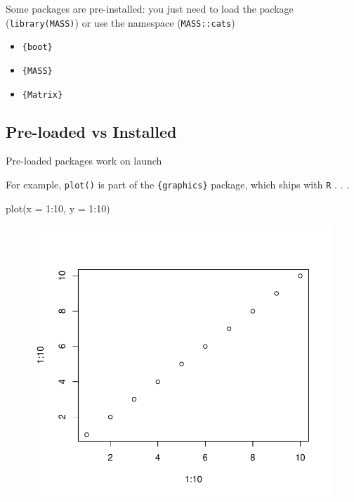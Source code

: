 \documentclass[
  letterpaper,
  DIV=11,
  numbers=noendperiod,
  oneside]{scrartcl}
\newenvironment{Shaded}{\begin{snugshade}}{\end{snugshade}}
\newcommand{\AttributeTok}[1]{\textcolor[rgb]{0.40,0.45,0.13}{#1}}
\newcommand{\DecValTok}[1]{\textcolor[rgb]{0.68,0.00,0.00}{#1}}
\newcommand{\FunctionTok}[1]{\textcolor[rgb]{0.28,0.35,0.67}{#1}}
\newcommand{\NormalTok}[1]{\textcolor[rgb]{0.00,0.23,0.31}{#1}}
\newcommand{\SpecialCharTok}[1]{\textcolor[rgb]{0.37,0.37,0.37}{#1}}
\providecommand{\tightlist}{%
  \setlength{\itemsep}{0pt}\setlength{\parskip}{0pt}}\usepackage{longtable,booktabs,array}
\begin{document}
Some packages are pre-installed: you just need to load the package
(\texttt{library(MASS)}) or use the namespace (\texttt{MASS::cats})

\begin{itemize}
\tightlist
\item
  \texttt{\{boot\}}
\item
  \texttt{\{MASS\}}
\item
  \texttt{\{Matrix\}}
\end{itemize}

\hypertarget{pre-loaded-vs-installed}{%
\subsection{Pre-loaded vs Installed}\label{pre-loaded-vs-installed}}

Pre-loaded packages work on launch

For example, \texttt{plot()} is part of the \texttt{\{graphics\}}
package, which ships with \texttt{R} . . .

\begin{Shaded}
\begin{Highlighting}[]
\FunctionTok{plot}\NormalTok{(}\AttributeTok{x =} \DecValTok{1}\SpecialCharTok{:}\DecValTok{10}\NormalTok{, }\AttributeTok{y =} \DecValTok{1}\SpecialCharTok{:}\DecValTok{10}\NormalTok{)}
\end{Highlighting}
\end{Shaded}

\begin{figure}[H]

{\centering \includegraphics{w1_intro_files/figure-pdf/unnamed-chunk-19-1.pdf}

}

\end{figure}
\end{document}
